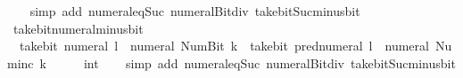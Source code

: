 \begin{isabellebody}
%
\isadelimproof
\ \ %
\endisadelimproof
%
\isatagproof
{}\isamarkupfalse%
\ {\isacharparenleft}{\kern0pt}simp\ add{\isacharcolon}{\kern0pt}\ numeral{\isacharunderscore}{\kern0pt}eq{\isacharunderscore}{\kern0pt}Suc\ numeral{\isacharunderscore}{\kern0pt}Bit{}{\isacharunderscore}{\kern0pt}div{\isacharunderscore}{\kern0pt}{}\ take{\isacharunderscore}{\kern0pt}bit{\isacharunderscore}{\kern0pt}Suc{\isacharunderscore}{\kern0pt}minus{\isacharunderscore}{\kern0pt}bit{}{\isacharparenright}{\kern0pt}%
\endisatagproof
{\isafoldproof}%
%
\isadelimproof
\isanewline
%
\endisadelimproof
\isanewline
{}\isamarkupfalse%
\ take{\isacharunderscore}{\kern0pt}bit{\isacharunderscore}{\kern0pt}numeral{\isacharunderscore}{\kern0pt}minus{\isacharunderscore}{\kern0pt}bit{}{\isacharcolon}{\kern0pt}\isanewline
\ \ {\isacartoucheopen}take{\isacharunderscore}{\kern0pt}bit\ {\isacharparenleft}{\kern0pt}numeral\ l{\isacharparenright}{\kern0pt}\ {\isacharparenleft}{\kern0pt}{\isacharminus}{\kern0pt}\ numeral\ {\isacharparenleft}{\kern0pt}Num{\isachardot}{\kern0pt}Bit{}\ k{\isacharparenright}{\kern0pt}{\isacharparenright}{\kern0pt}\ {\isacharequal}{\kern0pt}\ take{\isacharunderscore}{\kern0pt}bit\ {\isacharparenleft}{\kern0pt}pred{\isacharunderscore}{\kern0pt}numeral\ l{\isacharparenright}{\kern0pt}\ {\isacharparenleft}{\kern0pt}{\isacharminus}{\kern0pt}\ numeral\ {\isacharparenleft}{\kern0pt}Num{\isachardot}{\kern0pt}inc\ k{\isacharparenright}{\kern0pt}{\isacharparenright}{\kern0pt}\ {\isacharasterisk}{\kern0pt}\ {}\ {\isacharplus}{\kern0pt}\ {\isacharparenleft}{\kern0pt}{}\ {\isacharcolon}{\kern0pt}{\isacharcolon}{\kern0pt}\ int{\isacharparenright}{\kern0pt}{\isacartoucheclose}\isanewline
%
\isadelimproof
\ \ %
\endisadelimproof
%
\isatagproof
{}\isamarkupfalse%
\ {\isacharparenleft}{\kern0pt}simp\ add{\isacharcolon}{\kern0pt}\ numeral{\isacharunderscore}{\kern0pt}eq{\isacharunderscore}{\kern0pt}Suc\ numeral{\isacharunderscore}{\kern0pt}Bit{}{\isacharunderscore}{\kern0pt}div{\isacharunderscore}{\kern0pt}{}\ take{\isacharunderscore}{\kern0pt}bit{\isacharunderscore}{\kern0pt}Suc{\isacharunderscore}{\kern0pt}minus{\isacharunderscore}{\kern0pt}bit{}{\isacharparenright}{\kern0pt}%
\endisatagproof
{\isafoldproof}%
%
\isadelimproof
%
\endisadelimproof
%
\isadelimdocument
%
\endisadelimdocument
%
\isatagdocument
%
\isamarkuptrue%
%
\endisatagdocument
{\isafolddocument}%

\end{isabellebody}
